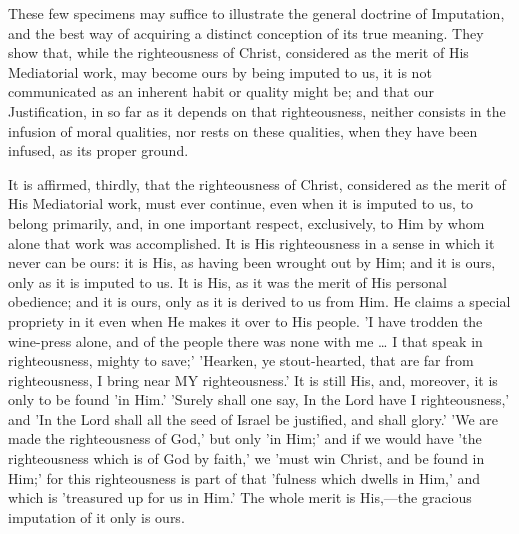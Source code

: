 \documentclass[
]{book}
\begin{document}
These few specimens may suffice to illustrate the general doctrine of Imputation, and the best way of acquiring a distinct conception of its true meaning. They show that, while the righteousness of Christ, considered as the merit of His Mediatorial work, may become ours by being imputed to us, it is not communicated as an inherent habit or quality might be; and that our Justification, in so far as it depends on that righteousness, neither consists in the infusion of moral qualities, nor rests on these qualities, when they have been infused, as its proper ground.

It is affirmed, thirdly, that the righteousness of Christ, considered as the merit of His Mediatorial work, must ever continue, even when it is imputed to us, to belong primarily, and, in one important respect, exclusively, to Him by whom alone that work was accomplished. It is His righteousness in a sense in which it never can be ours: it is His, as having been wrought out by Him; and it is ours, only as it is imputed to us. It is His, as it was the merit of His personal obedience; and it is ours, only as it is derived to us from Him. He claims a special propriety in it even when He makes it over to His people. 'I have trodden the wine-press alone, and of the people there was none with me \ldots{} I that speak in righteousness, mighty to save;' 'Hearken, ye stout-hearted, that are far from righteousness, I bring near MY righteousness.' It is still His, and, moreover, it is only to be found 'in Him.' 'Surely shall one say, In the Lord have I righteousness,' and 'In the Lord shall all the seed of Israel be justified, and shall glory.' 'We are made the righteousness of God,' but only 'in Him;' and if we would have 'the righteousness which is of God by faith,' we 'must win Christ, and be found in Him;' for this righteousness is part of that 'fulness which dwells in Him,' and which is 'treasured up for us in Him.' The whole merit is His,---the gracious imputation of it only is ours.
\end{document}
